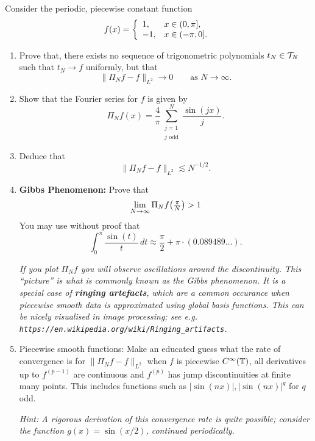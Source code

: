 \begin{exercise} \label{exr:trig:gibbs}
  Consider the periodic, piecewise constant function
  \[
      f(x) = \left\{ \begin{array}{ll} 
        1, & x \in (0, \pi], \\
        -1, & x \in (-\pi, 0].
       \end{array} \right.
  \]
  \begin{enumerate} \ilist
  \item Prove that, there exists no sequence of trigonometric polynomials
  $t_N \in \mathcal{T}_N$ such that $t_N \to f$ uniformly, but that
  \[
    \|\Pi_N f - f\|_{L^2} \to 0 \qquad \text{as } N \to \infty.
  \]

  \item Show that the Fourier series for $f$ is given by
  \[
    \Pi_N f(x) = \frac{4}{\pi} \sum_{\substack{j = 1 \\ j \text{ odd}}}^{N}
        \frac{\sin(jx)}{j}.
  \]

  \item Deduce that
  \[
      \| \Pi_N f - f \|_{L^2} \lesssim N^{-1/2}.
  \]

  \item {\bf Gibbs Phenomenon: } Prove that
  \[
    \lim_{N \to \infty} \Pi_N f\big({\textstyle \frac{\pi}{N}} \big) > 1
  \]
  You may use without proof that
  \[
      \int_0^\pi \frac{\sin(t)}{t} \,dt \approx
      \frac{\pi}{2} + \pi \cdot (0.089489\dots).
  \]

  {\it If you plot $\Pi_N f$ you will observe oscillations around the
  discontinuity. This ``picture'' is what is commonly known as the Gibbs
  phenomenon. It is a special case of {\bf ringing artefacts}, which are
  a common occurance when piecewise smooth data is approximated using
  global basis functions. This can be nicely visualised in image processing;
  see e.g. {\tt https://en.wikipedia.org/wiki/Ringing\_artifacts}.}

  \item {Piecewise smooth functions: } Make an educated guess what the
  rate of convergence is for $\|\Pi_N f - f \|_{L^2}$ when $f$ is piecewise
  $C^\infty(\mathbb{T})$, all derivatives up to $f^{(p-1)}$ are continuous and
  $f^{(p)}$ has jump discontinuities at finite many points. This includes
  functions such as $|\sin(nx)|, |\sin(nx)|^q$ for $q$ odd.

  {\it Hint: A rigorous derivation of this convergence rate is quite
  possible; consider the function $g(x) = \sin(x/2)$, continued periodically.}
  \qedhere
  \end{enumerate}
\end{exercise}



